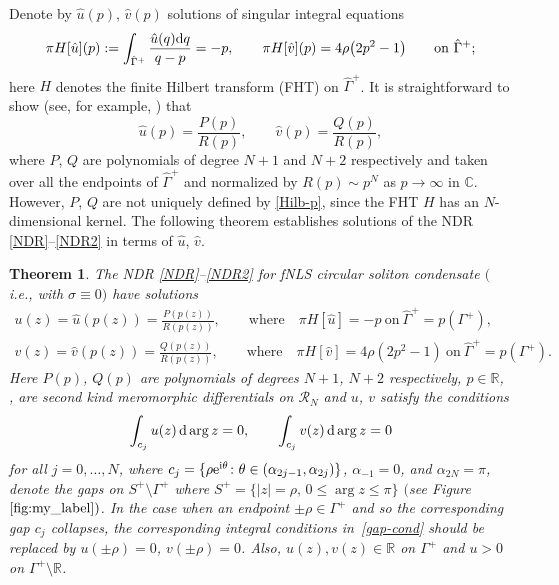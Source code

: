 \documentclass[pdftex]{sigma}
\numberwithin{equation}{section}
\newtheorem{Theorem}{Theorem}[section]
\def\be{\begin{equation}}
\def\ee{\end{equation}}
\def\ra{\rightarrow}
\newcommand{\G}{\Gamma}
\def\C{{\mathbb C}}
\def\R{{\mathbb R}}
\def\hf{\frac{1}{2}}
\def\G{\Gamma}
\begin{document}
Denote by $\hat u(p)$, $\hat v(p)$ solutions of singular integral equations
\begin{gather}\label{Hilb-p}
\pi H[\hat u](p):=\int_{\hat \G^+}\frac{\hat u(q){\rm d}q}{q-p}=-p, \qquad \pi H[\hat v](p)=4\rho\bigl(2p^2-1\bigr) \qquad \text{on}\ \hat\G^+ ;
\end{gather}
here $H$ denotes the finite Hilbert transform (FHT) on $\hat\G^+$. It is straightforward to show (see, for example, \cite{KT2021}) that
\be\label{hat-uv}
\hat u(p)= \frac{P(p)}{R(p)}, \qquad
\hat v(p)=\frac{Q(p)}{ R(p)},
\ee
where $P$, $Q$ are polynomials of degree $N+1$ and $N+2$ respectively and \smash{$R(p)=\prod_j(p-p(z_j))^\hf$} taken over all the endpoints of $\hat \G^+$ and normalized by $R(p)\sim p^N$ as $p\ra\infty$ in $\C$.
However, $P$, $Q$ are not uniquely defined by \eqref{Hilb-p}, since the FHT $H$ has an $N$-dimensional kernel. The following theorem establishes solutions of the NDR \eqref{NDR}--\eqref{NDR2} in terms of $\hat u$, $\hat v$.
\begin{Theorem}\label{th-main-1}
The NDR \eqref{NDR}--\eqref{NDR2} for fNLS circular soliton condensate $($i.e., with $\sigma\equiv 0)$ have solutions
\begin{gather}%
u(z)= \hat u(p(z))= \frac{P(p(z))}{ R(p(z))}, \qquad \text{where} \quad \pi H[\hat u]=-p \ \text{on}\ \hat\G^+=p(\G^+),\nonumber\\
v(z)= \hat v(p(z))=\frac{ Q(p(z))}{ R(p(z))},\qquad \text{where} \quad \pi H[\hat v]=4\rho(2p^2-1)
\ \text{on}\ \hat\G^+=p(\G^+). \label{NDRinMain2}
\end{gather}
Here $P(p)$, $Q(p)$ are polynomials of degrees $N+1$, $N+2$ respectively, $p\in\R$, ,  are
second kind meromorphic differentials on $\mathcal{R}_N$ and
$u$, $v$ satisfy the conditions
\begin{gather} \label{gap-cond}
\int_{c_j} u(z)\,{\rm d}\arg z=0, \qquad
\int_{c_j} v(z)\,{\rm d}\arg z=0
\end{gather}
for all
$j=0,\dots,N$, where $c_j=\{\rho {\rm e}^{{\rm i}\theta}\colon \theta\in (\alpha_{2j-1},\alpha_{2j})\}$, $\alpha_{-1}=0$, and $\alpha_{2N}=\pi$, denote the gaps on $S^+\setminus \G^+$ where
$S^+=\{|z|=\rho,\, 0\leq \arg z\leq \pi\}$ $($see Figure~$\ref{fig:my_label})$. In the case when an endpoint $\pm\rho\in\G^+$ and so the corresponding gap $c_j$ collapses, the corresponding integral conditions in~\eqref{gap-cond} should be replaced by $u(\pm\rho)=0$,
$v(\pm\rho)=0$. Also, $u(z),v(z)\in\R$ on $\G^+$ and $u>0$ on $\G^+\setminus\R$.
\end{Theorem}
\end{document}
